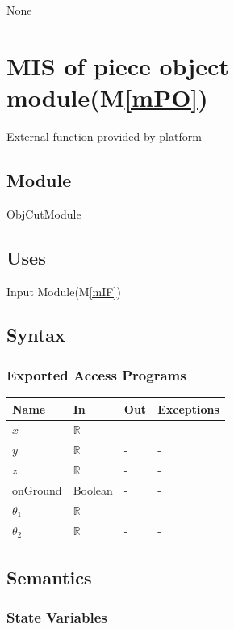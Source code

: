 \documentclass[12pt, titlepage]{article}
\newcommand{\mref}[1]{M\ref{#1}}
\begin{document}
None

\section{MIS of piece object module(\mref{mPO})}

External function provided by platform

\subsection{Module}

ObjCutModule

\subsection{Uses}

Input Module(\mref{mIF})

\subsection{Syntax}

\subsubsection{Exported Access Programs}

\begin{center}
	\begin{tabular}{p{2cm} p{4cm} p{4cm} p{2cm}}
		\hline
		\textbf{Name} & \textbf{In} & \textbf{Out} & \textbf{Exceptions} \\
		\hline
		$x$ & $\mathbb{R}$ & - & - \\
		$y$ & $\mathbb{R}$ & - & - \\
		$z$ & $\mathbb{R}$ & - & - \\
		onGround & Boolean & - & - \\
		$\theta_{1}$ & $\mathbb{R}$ & - & - \\
		$\theta_{2}$ & $\mathbb{R}$ & - & - \\
		\hline
	\end{tabular}
\end{center}

\subsection{Semantics}

\subsubsection{State Variables}
\end{document}
